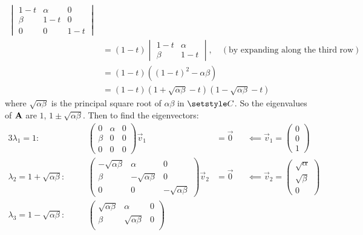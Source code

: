 \documentclass[fleqn,a4paper,11pt]{article}
\begin{document}
\begin{enumerate}[label=\textbf{\arabic*.}]
\begin{align*}
\begin{vmatrix}
      1 - t & \alpha & 0 \\
      \beta & 1 - t & 0 \\
      0 & 0 & 1 - t
     \end{vmatrix} \\
     &= (1 - t)\begin{vmatrix}
      1 - t & \alpha \\
      \beta & 1 - t
     \end{vmatrix},\quad (\text{by expanding along the third row}) \\
     &= (1 - t)((1 - t)^2 - \alpha \beta) \\
     &= (1 - t)(1 + \sqrt{\alpha \beta} - t)(1 - \sqrt{\alpha \beta} - t)
   \end{align*}
   where \(\sqrt{\alpha \beta}\) is the principal square root of
   \(\alpha \beta\) in \(\Complex\). So the eigenvalues of \(\mathbf{A}\) are
   \(1\), \(1 \pm \sqrt{\alpha \beta}\). Then to find the eigenvectors:
   \begin{alignat*}3
    \lambda_1 = 1:\quad&&
     \begin{pmatrix}
      0 & \alpha & 0 \\
      \beta & 0 & 0 \\
      0 & 0 & 0
     \end{pmatrix}
     \vec v_1 &= \vec 0
     &&\impliedby \vec v_1 = \begin{pmatrix} 0 \\ 0 \\ 1 \end{pmatrix} \\
    \lambda_2 = 1 + \sqrt{\alpha \beta}:\quad&&
     \begin{pmatrix}
      -\sqrt{\alpha \beta} & \alpha & 0 \\
      \beta & -\sqrt{\alpha \beta} & 0 \\
      0 & 0 & -\sqrt{\alpha \beta}
     \end{pmatrix}
     \vec v_2 &= \vec 0
     &&\impliedby \vec v_2 =
     \begin{pmatrix} \sqrt \alpha \\ \sqrt \beta \\ 0 \end{pmatrix} \\
    \lambda_3 = 1 - \sqrt{\alpha \beta}:\quad&&
     \begin{pmatrix}
      \sqrt{\alpha \beta} & \alpha & 0 \\
      \beta & \sqrt{\alpha \beta} & 0 \\

\end{pmatrix}
\end{alignat*}
\end{enumerate}
\end{document}
